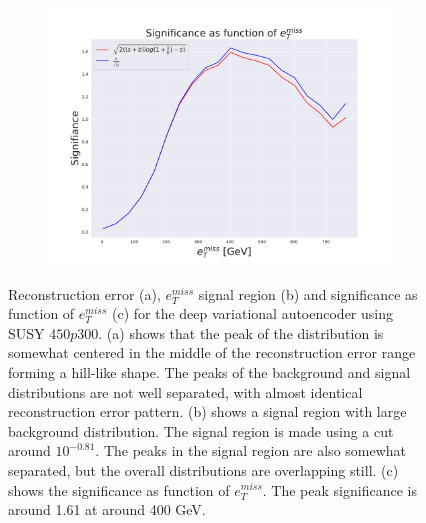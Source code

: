 \begin{figure}[!htb]
\begin{subfigure}{.49\textwidth}
        \caption{}
        \label{fig:VAE_2lep_big_etmiss_450}
    \end{subfigure}
    \hfill 
    \begin{subfigure}{.49\textwidth}
        \includegraphics[width=\textwidth]{Figures/VAE_testing/big/2lep/significance_etmiss_450p0p0300_-0.8121874101107931.pdf}
        \caption{}
        \label{fig:VAE_2lep_big_signi_450}
    \end{subfigure}
    \hfill      
    \caption[2lep deep network | $450p300$ | VAE]{Reconstruction error (a), $e_T^{miss}$ signal region (b) and significance as function of 
    $e_T^{miss}$ (c) for the deep variational autoencoder using SUSY $450p300$. 
    (a) shows that the peak of the distribution is somewhat centered in the middle 
    of the reconstruction error range forming a hill-like shape. The peaks of the background and signal 
    distributions are not well separated, with almost identical reconstruction error pattern. (b) 
    shows a signal region with large background distribution. The signal region is made using a cut around
    $10^{-0.81}$. The peaks in the signal region are also somewhat 
    separated, but the overall distributions are overlapping still. 
    (c) shows the significance as function of $e_T^{miss}$. 
    The peak significance is around 1.61 at around 400 GeV.}
    \label{fig:VAE_2lep_big_rec_sig_signi_450}
\end{figure}

